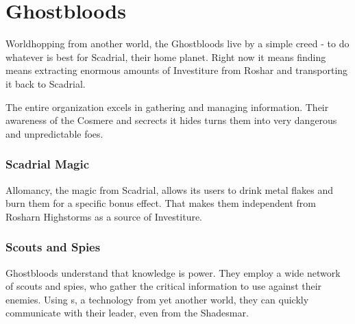 \section{Ghostbloods}
\label{sec:enemyFractionGhostbloods}

Worldhopping from another world, the Ghostbloods live by a simple creed - to do whatever is best for Scadrial, their home planet. Right now it means finding means extracting enormous amounts of Investiture from Roshar and transporting it back to Scadrial.

The entire organization excels in gathering and managing information. Their awareness of the Cosmere and secrects it hides turns them into very dangerous and unpredictable foes.

\subsubsection{Scadrial Magic}

Allomancy, the magic from Scadrial, allows its users to drink metal flakes and burn them for a specific bonus effect. That makes them independent from Rosharn Highstorms as a source of Investiture.

\subsubsection{Scouts and Spies}

Ghostbloods understand that knowledge is power. They employ a wide network of scouts and spies, who gather the critical information to use against their enemies. Using \lootSeonTube{}s, a technology from yet another world, they can quickly communicate with their leader, even from the Shadesmar.



\newpage

\newpage

\newpage

\newpage

\newpage

\newpage





